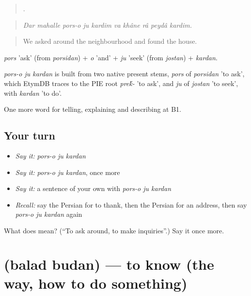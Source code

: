 \begin{quote}
          .
\end{quote}

\begin{quote}
\emph{Dar mahalle pors-o ju kardim va khâne râ peydâ kardim.}
\end{quote}

\begin{quote}
We asked around the neighbourhood and found the house.
\end{quote}

\emph{pors} 'ask' (from \emph{porsidan}) + \emph{o} 'and' + \emph{ju} 'seek' (from \emph{jostan}) + \emph{kardan}.

\begin{cousinweb}
\emph{pors-o ju kardan} is built from two native present stems, \emph{pors} of \emph{porsidan} 'to ask', which EtymDB traces to the PIE root \emph{pre\'{k}-} 'to ask', and \emph{ju} of \emph{jostan} 'to seek', with \emph{kardan} 'to do'.
\end{cousinweb}

\begin{grammarlens}[title={What you've built}]
One more word for telling, explaining and describing at B1.
\end{grammarlens}

\subsection*{Your turn}
\begin{itemize}
\raggedright
  \item \emph{Say it:} \emph{pors-o ju kardan}
  \item \emph{Say it:} \emph{pors-o ju kardan}, once more
  \item \emph{Say it:} a sentence of your own with \emph{pors-o ju kardan}
  \item \emph{Recall:} say the Persian for to thank, then the Persian for an address, then say \emph{pors-o ju kardan} again
\end{itemize}

\begin{tcolorbox}[breakable,colback=teal!4,colframe=teal!35!black,title={Before you move on}]
What does     mean? (\textquotedblleft{}To ask around, to make inquiries\textquotedblright{}.) Say it once more.
\end{tcolorbox}
\section[\texorpdfstring{\fa{بلد} \fa{بودن} (balad budan)}{بلد بودن (balad budan)}]{  (balad budan) — to know (the way, how to do something)}

